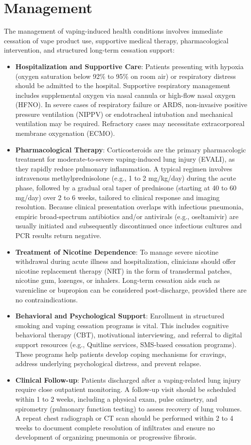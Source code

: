 \section*{Management}
The management of vaping-induced health conditions involves immediate cessation of vape product use, supportive medical therapy, pharmacological intervention, and structured long-term cessation support:
\begin{itemize}
    \item \textbf{Hospitalization and Supportive Care}: Patients presenting with hypoxia (oxygen saturation below 92\% to 95\% on room air) or respiratory distress should be admitted to the hospital. Supportive respiratory management includes supplemental oxygen via nasal cannula or high-flow nasal oxygen (HFNO). In severe cases of respiratory failure or ARDS, non-invasive positive pressure ventilation (NIPPV) or endotracheal intubation and mechanical ventilation may be required. Refractory cases may necessitate extracorporeal membrane oxygenation (ECMO).
    \item \textbf{Pharmacological Therapy}: Corticosteroids are the primary pharmacologic treatment for moderate-to-severe vaping-induced lung injury (EVALI), as they rapidly reduce pulmonary inflammation. A typical regimen involves intravenous methylprednisolone (e.g., 1 to 2 mg/kg/day) during the acute phase, followed by a gradual oral taper of prednisone (starting at 40 to 60 mg/day) over 2 to 6 weeks, tailored to clinical response and imaging resolution. Because clinical presentation overlaps with infectious pneumonia, empiric broad-spectrum antibiotics and/or antivirals (e.g., oseltamivir) are usually initiated and subsequently discontinued once infectious cultures and PCR results return negative.
    \item \textbf{Treatment of Nicotine Dependence}: To manage severe nicotine withdrawal during acute illness and hospitalization, clinicians should offer nicotine replacement therapy (NRT) in the form of transdermal patches, nicotine gum, lozenges, or inhalers. Long-term cessation aids such as varenicline or bupropion can be considered post-discharge, provided there are no contraindications.
    \item \textbf{Behavioral and Psychological Support}: Enrollment in structured smoking and vaping cessation programs is vital. This includes cognitive behavioral therapy (CBT), motivational interviewing, and referral to digital support resources (e.g., Quitline services, SMS-based cessation programs). These programs help patients develop coping mechanisms for cravings, address underlying psychological distress, and prevent relapse.
    \item \textbf{Clinical Follow-up}: Patients discharged after a vaping-related lung injury require close outpatient monitoring. A follow-up visit should be scheduled within 1 to 2 weeks, including a physical exam, pulse oximetry, and spirometry (pulmonary function testing) to assess recovery of lung volumes. A repeat chest radiograph or CT scan should be performed within 2 to 4 weeks to document complete resolution of infiltrates and ensure no development of organizing pneumonia or progressive fibrosis.
\end{itemize}

